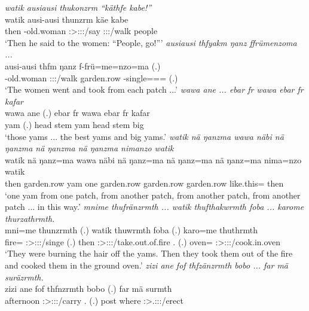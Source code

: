 \begin{exe}
	\emph{watik ausiausi thukonzrm ``käthfe kabe!''}\\
	\gll watik ausi-ausi thunzrm käe kabe\\ 
	then \Redup-old.woman \Sg:\Sbj>\Stpl:\Obj:\Pst:\Dur/say \Spl:\Sbj:\Imp:\Pfv/walk people\\
	\trans `Then he said to the women: ``People, go!'''
	\emph{ausiausi thfyakm ŋanz ffrümenzoma ...}\\
	\gll ausi-ausi thfm ŋanz f-frü=me=nzo=ma (.)\\ 
	\Redup-old.woman \Stpl:\Sbj:\Pst:\Dur/walk garden.row \Redup-single=\Ins=\Only=\Char{} (.)\\
	\trans `The women went and took from each patch ...'
	\emph{wawa ane ... ebar fr wawa ebar fr kafar}\\
	\gll wawa ane (.) ebar fr wawa ebar fr kafar\\ 
	yam \Dem{} (.) head stem yam head stem big\\
	\trans `those yams ... the best yams and big yams.'
	\emph{watik nä ŋanzma wawa näbi nä ŋanzma nä ŋanzma nä ŋanzma nimanzo watik}\\
	\gll watik nä ŋanz=ma wawa näbi nä ŋanz=ma nä ŋanz=ma nä ŋanz=ma nima=nzo watik\\ 
	then \Indf{} garden.row yam one \Indf{} garden.row \Indf{} garden.row \Indf{} garden.row like.this=\Only{} then\\
	\trans `one yam from one patch, from another patch, from another patch, from another patch ... in this way.'
	\emph{mnime thufränzrmth ... watik thufthakwrmth foba ... karome thurzathrmth.}\\
	\gll mni=me thunzrmth (.) watik thuwrmth foba (.) karo=me thuthrmth\\ 
	fire=\Ins{} \Stpl:\Sbj>\Stpl:\Obj:\Pst:\Dur/singe (.) then \Stpl:\Sbj>\Stpl:\Obj:\Pst:\Dur/take.out.of.fire \Dist.\Abl{} (.) oven=\Ins{} \Stpl:\Sbj>\Stpl:\Obj:\Pst:\Dur/cook.in.oven\\
	\trans `They were burning the hair off the yams. Then they took them out of the fire and cooked them in the ground oven.'
	\emph{zizi ane fof thfzänzrmth bobo ... far mä suräzrmth.}\\
	\gll zizi ane fof thfnzrmth bobo (.) far mä surmth\\ 
	afternoon \Dem{} \Emph{} \Stpl:\Sbj>\Stpl:\Obj:\Pst:\Dur/carry \Med.\All{} (.) post where \Stpl:\Sbj>\Tsg.\Masc:\Obj:\Pst:\Dur/erect\\

\end{exe}
